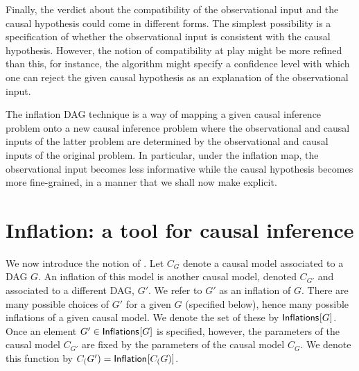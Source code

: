 Finally, the verdict about the compatibility of the observational input and the causal hypothesis could come in different forms.  The simplest possibility is a specification of whether the observational input is consistent with the causal hypothesis.  However, the notion of compatibility at play might be more refined than this, for instance, the algorithm might specify a confidence level with which one can reject the given causal hypothesis as an explanation of the observational input.


The inflation DAG technique is a way of mapping a given causal inference problem onto a new causal inference problem where the observational and causal inputs of the latter problem are determined by the observational and causal inputs of the original problem.   In particular, under the inflation map, the observational input becomes less informative while the causal hypothesis becomes more fine-grained, in a manner that we shall now make explicit.

\section{Inflation: a tool for causal inference}

We now introduce the notion of .  Let $C_G$ denote a causal model associated to a DAG $G$.  An inflation of this model is another causal model, denoted $C_{G'}$ and associated to a different DAG, $G'$.  We refer to $G'$ as an inflation of $G$.  There are many possible choices of $G'$ for a given $G$ (specified below), hence many possible inflations of a given causal model.  We denote the set of these by ${\operatorname{\mathsf{Inflations}}_{}}\lbrack G\rbrack$.   Once an element $G'\in {\operatorname{\mathsf{Inflations}}_{}}\lbrack G\rbrack$ is specified, however, the parameters of the causal model $C_{G'}$ are fixed by the parameters of the causal model $C_{G}$.  We denote this function by $C_(G') = {\operatorname{\mathsf{Inflation}}_{}}\lbrack C_(G)\rbrack$.

